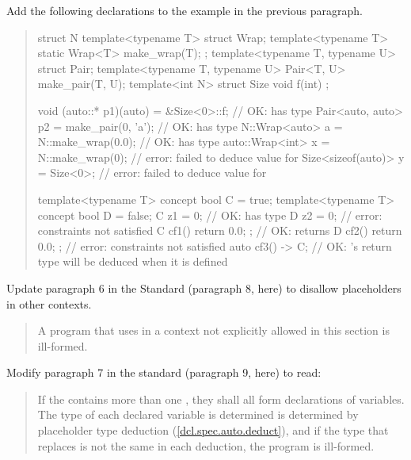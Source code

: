Add the following declarations to the example in the previous paragraph.

\begin{quote}
\begin{addedblock}
\begin{codeblock}
struct N {
  template<typename T> struct Wrap;
  template<typename T> static Wrap<T> make_wrap(T);
};
template<typename T, typename U> struct Pair;
template<typename T, typename U> Pair<T, U> make_pair(T, U);
template<int N> struct Size { void f(int) { }  };

void (auto::* p1)(auto) = &Size<0>::f;   // OK:  has type 
Pair<auto, auto> p2 = make_pair(0, 'a'); // OK:  has type 
N::Wrap<auto> a = N::make_wrap(0.0);     // OK:  has type 
auto::Wrap<int> x = N::make_wrap(0);     // error: failed to deduce value for 
Size<sizeof(auto)> y = Size<0>{};        // error: failed to deduce value for 

template<typename T> concept bool C = true;
template<typename T> concept bool D = false;
C z1 = 0;                // OK:  has type 
D z2 = 0;                // error: constraints not satisfied
C cf1() { return 0.0; }; // OK:  returns 
D cf2() { return 0.0; }; // error: constraints not satisfied
auto cf3() -> C;         // OK: 's return type will be deduced when it is defined
\end{codeblock}
\end{addedblock}
\end{quote}

Update paragraph 6 in the \Cpp Standard (paragraph 8, here) to disallow 
placeholders in other contexts.

\begin{quote}
\pnum
A program that uses 
 in a context not explicitly allowed in this section is 
ill-formed.
\end{quote}


Modify paragraph 7 in the \Cpp standard (paragraph 9, here) to read:

\begin{quote}
\pnum
If the  contains more than one 
, they shall all form declarations of variables.
The type of each declared variable is determined is determined by placeholder 
type deduction (\ref{dcl.spec.auto.deduct}), and if 
the type that replaces  
is not the same in each deduction, the program is ill-formed.
\end{quote}

